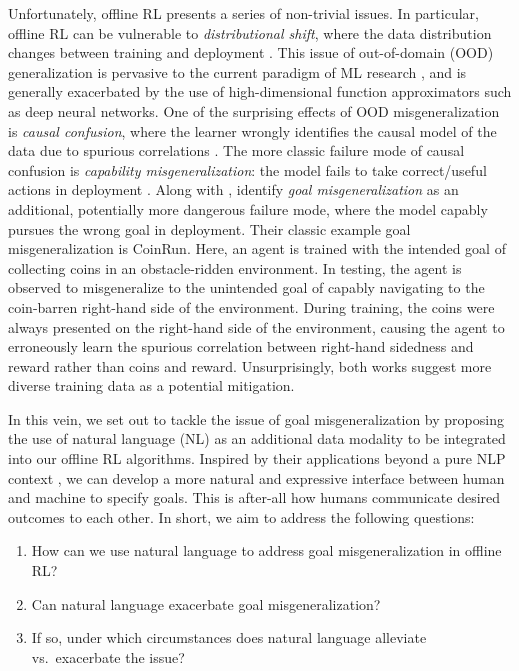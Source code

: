 \documentclass[../thesis-proposal/main.tex]{subfiles}
\begin{document}
Unfortunately, offline RL presents a series of non-trivial issues. In particular, offline RL can be
vulnerable to \textit{distributional shift}, where the data distribution changes between training
and deployment \citep{quinonero-candela_dataset_2008}. This issue of out-of-domain (OOD)
generalization \citep{shen_towards_2021} is pervasive to the current paradigm of ML research
\citep{arjovsky_out_2020}, and is generally exacerbated by the use of high-dimensional function
approximators such as deep neural networks. One of the surprising effects of OOD misgeneralization
is \textit{causal confusion}, where the learner wrongly identifies the causal model of the data due
to spurious correlations \citep{de_haan_causal_2019}. The more classic  failure mode of causal
confusion is \textit{capability misgeneralization}: the model fails to take correct/useful actions
in deployment \citep{gupta_can_2022, tien_study_2022}. Along with \citet{shah_goal_2022},
\citet{langosco_goal_2022} identify \textit{goal misgeneralization} as an additional, potentially
more dangerous failure mode, where the model capably pursues the wrong goal in deployment. Their
classic example goal misgeneralization is CoinRun. Here, an agent is trained with the intended goal
of collecting coins in an obstacle-ridden environment. In testing, the agent is observed to
misgeneralize to the unintended goal of capably navigating to the coin-barren right-hand side of the
environment. During training, the coins were always presented on the right-hand side of the
environment, causing the agent to erroneously learn the spurious correlation between right-hand
sidedness and reward rather than coins and reward. Unsurprisingly, both works suggest more diverse
training data as a potential mitigation.

In this vein, we set out to tackle the issue of goal misgeneralization by proposing the use of
natural language (NL) as an additional data modality to be integrated into our offline RL
algorithms. Inspired by their applications beyond a pure NLP context \citep{dosovitskiy_image_2022,
ramesh_hierarchical_2022, rombach_high-resolution_2022}, we can develop a more natural and
expressive interface between human and machine to specify goals. This is after-all how humans
communicate desired outcomes to each other. In short, we aim to address the following questions:

\begin{enumerate}
  \item How can we use natural language to address goal misgeneralization in offline RL?
  \item Can natural language exacerbate goal misgeneralization?
  \item If so, under which circumstances does natural language alleviate vs.~exacerbate the issue?
\end{enumerate}
\end{document}
